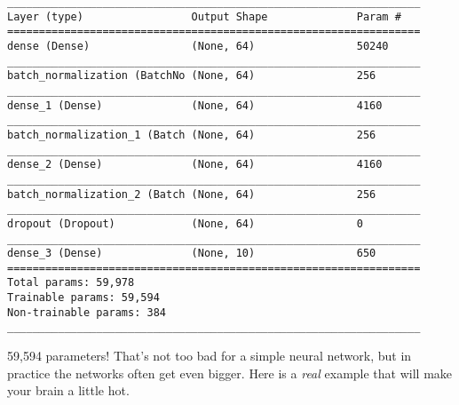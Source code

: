 \begin{lstlisting}[style=kaolstplain,linewidth=1.5\textwidth]
_________________________________________________________________
Layer (type)                 Output Shape              Param #   
=================================================================
dense (Dense)                (None, 64)                50240     
_________________________________________________________________
batch_normalization (BatchNo (None, 64)                256       
_________________________________________________________________
dense_1 (Dense)              (None, 64)                4160      
_________________________________________________________________
batch_normalization_1 (Batch (None, 64)                256       
_________________________________________________________________
dense_2 (Dense)              (None, 64)                4160      
_________________________________________________________________
batch_normalization_2 (Batch (None, 64)                256       
_________________________________________________________________
dropout (Dropout)            (None, 64)                0         
_________________________________________________________________
dense_3 (Dense)              (None, 10)                650       
=================================================================
Total params: 59,978
Trainable params: 59,594
Non-trainable params: 384
_________________________________________________________________
\end{lstlisting}

59,594 parameters! That's not too bad for a simple neural network, but in practice the networks often get even bigger. Here is a \textit{real} example that will make your brain a little hot.

